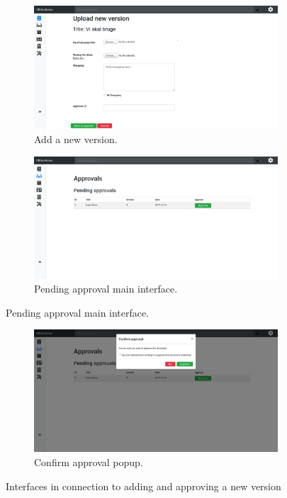 \begin{figure}[H]
	\centering
	\begin{subfigure}[b]{0.48\textwidth}
		\includegraphics[width=\textwidth]{billeder/iteration3Prototyper/Ver.png}
		\caption{Add a new version.}
		\label{fig:5-Add}
	\end{subfigure}
	\quad
	\begin{subfigure}[b]{0.48\textwidth}
		\includegraphics[width=\textwidth]{billeder/iteration3Prototyper/Approve.png}
		\caption{Pending approval main interface.}
		\label{fig:5-Approve}
	\end{subfigure}
\end{figure}
\begin{figure}[H]\ContinuedFloat
	\centering
	\begin{subfigure}[b]{0.48\textwidth}
		\includegraphics[width=\textwidth]{billeder/iteration3Prototyper/AppConfirm.png}
		\caption{Confirm approval popup.}
		\label{fig:5-AppConfirm}
	\end{subfigure}
	\caption{Interfaces in connection to adding and approving a new version}\label{fig:5-Approval}
\end{figure}

